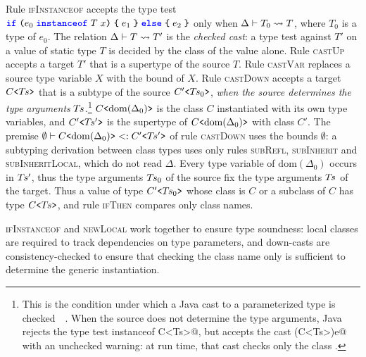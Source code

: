 Rule \textsc{ifInstanceof} accepts the type test $\text{\ttfamily\bfseries\color{blue}if}\mskip5mu\text{\ttfamily (} e_0\mskip5mu\text{\ttfamily\bfseries\color{blue}instanceof}\mskip5mu T\mskip5mu x\text{\ttfamily )}\mskip5mu\text{\ttfamily \{}\mskip5mu e_1\mskip5mu\text{\ttfamily \}}\mskip5mu\text{\ttfamily\bfseries\color{blue}else}\mskip5mu\text{\ttfamily \{}\mskip5mu e_2\mskip5mu\text{\ttfamily \}}$ only when $\Delta\vdash T_0 \rightsquigarrow T$, where $T_0$ is a type of $e_0$.
The relation $\Delta\vdash T \rightsquigarrow T'$ is the \emph{checked cast}: a type test against $T'$ on a value of static type $T$ is decided by the class of the value alone.
Rule \textsc{castUp} accepts a target $T'$ that is a supertype of the source $T$.
Rule \textsc{castVar} replaces a source type variable $X$ with the bound of $X$.
Rule \textsc{castDown} accepts a target $C\text{\ttfamily <}T\mkern-2mu s\text{\ttfamily >}$ that is a subtype of the source $C'\text{\ttfamily <}T\mkern-2mu s_0\text{\ttfamily >}$, \emph{when the source determines the type arguments} $T\mkern-2mu s$.\footnote{This is the condition under which a Java cast to a parameterized type is checked~\cite[Section~5.1.6.2]{jls}~\cite{bracha1998making}.
When the source does not determine the type arguments, Java rejects the type test \Q@e instanceof C<Ts>@, but accepts the cast \Q@(C<Ts>)e@ with an unchecked warning: at run time, that cast checks only the class \Q@C@.}
$C\text{\ttfamily <}\mathrm{dom}(\Delta_0)\text{\ttfamily >}$ is the class $C$ instantiated with its own type variables, and $C'\text{\ttfamily <}T\mkern-2mu s'\text{\ttfamily >}$ is the supertype of $C\text{\ttfamily <}\mathrm{dom}(\Delta_0)\text{\ttfamily >}$ with class $C'$.
The premise $\emptyset\vdash C\text{\ttfamily <}\mathrm{dom}(\Delta_0)\text{\ttfamily >} <: C'\text{\ttfamily <}T\mkern-2mu s'\text{\ttfamily >}$ of rule \textsc{castDown} uses the bounds $\emptyset$: a subtyping derivation between class types uses only rules \textsc{subRefl}, \textsc{subInherit} and \textsc{subInheritLocal}, which do not read $\Delta$.
Every type variable of $\mathrm{dom}(\Delta_0)$ occurs in $T\mkern-2mu s'$, thus the type arguments $T\mkern-2mu s_0$ of the source fix the type arguments $T\mkern-2mu s$ of the target.
Thus a value of type $C'\text{\ttfamily <}T\mkern-2mu s_0\text{\ttfamily >}$ whose class is $C$ or a subclass of $C$ has type $C\text{\ttfamily <}T\mkern-2mu s\text{\ttfamily >}$, and rule \textsc{ifThen} compares only class names.

\textsc{ifInstanceof} and \textsc{newLocal} work together to ensure type soundness: local classes are required to track dependencies on type parameters, and down-casts are consistency-checked to ensure that checking the class name only is sufficient to determine the generic instantiation.


